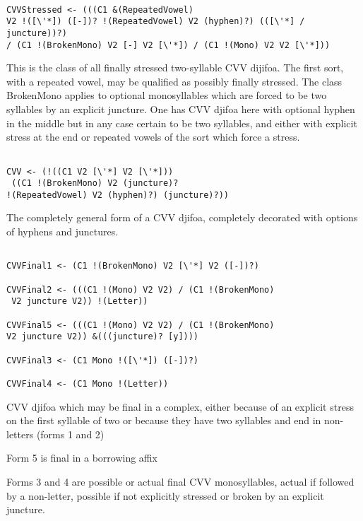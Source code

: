\documentclass[12pt]{article}
\begin{document}
\begin{verbatim}

CVVStressed <- (((C1 &(RepeatedVowel) 
V2 !([\'*]) ([-])? !(RepeatedVowel) V2 (hyphen)?) (([\'*] / juncture))?) 
/ (C1 !(BrokenMono) V2 [-] V2 [\'*]) / (C1 !(Mono) V2 V2 [\'*]))

\end{verbatim}

This is the class of all finally stressed two-syllable CVV dijifoa.  The first sort, with a repeated vowel, may be qualified as possibly finally stressed.  The class BrokenMono applies to optional monosyllables which are forced to be two syllables by an explicit juncture.  One has CVV djifoa here with optional hyphen in the middle but in any case certain to be two syllables,
and either with explicit stress at the end or repeated vowels of the sort which force a stress.

\begin{verbatim}

CVV <- (!((C1 V2 [\'*] V2 [\'*]))
 ((C1 !(BrokenMono) V2 (juncture)? 
!(RepeatedVowel) V2 (hyphen)?) (juncture)?))

\end{verbatim}

The completely general form of a CVV djifoa, completely decorated with options of hyphens and junctures.

\begin{verbatim}

CVVFinal1 <- (C1 !(BrokenMono) V2 [\'*] V2 ([-])?)

CVVFinal2 <- (((C1 !(Mono) V2 V2) / (C1 !(BrokenMono)
 V2 juncture V2)) !(Letter))

CVVFinal5 <- (((C1 !(Mono) V2 V2) / (C1 !(BrokenMono) 
V2 juncture V2)) &(((juncture)? [y])))

CVVFinal3 <- (C1 Mono !([\'*]) ([-])?)

CVVFinal4 <- (C1 Mono !(Letter))

\end{verbatim}

CVV djifoa which may be final in a complex, either because of an explicit stress on the first syllable of two
or because they have two syllables and end in non-letters (forms 1 and 2)

Form 5 is final in a borrowing affix

Forms 3 and 4 are possible or actual final CVV monosyllables, actual if followed by a non-letter, 
possible if not explicitly stressed or broken by an explicit juncture.
\end{document}
